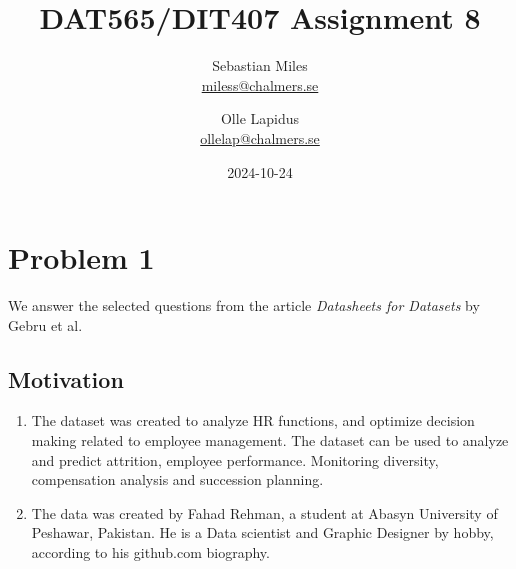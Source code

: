 \documentclass[a4paper]{article}
\newcommand{\enum}[1]{\begin{enumerate}[labelsep=0.3cm,labelwidth=\widthof{\ref{last-item}}, itemindent=0em,leftmargin=!, label=\arabic*).]#1 \end{enumerate}}
\begin{document}
\author{
  Sebastian Miles \\
  \href{mailto:miless@chalmers.se}{miless@chalmers.se}
  \and
  Olle Lapidus \\
  \href{mailto:ollelap@chalmers.se}{ollelap@chalmers.se}
}
\title{DAT565/DIT407 Assignment 8}
\date{2024-10-24}

\maketitle
\section*{Problem 1}
We answer the selected questions from the article \textit{Datasheets for Datasets} by Gebru et al. \cite{Gebru:2021}
\subsection*{Motivation}
\enum{
\item The dataset was created to analyze HR functions, and optimize decision making related to employee management. The dataset can be used to analyze and predict attrition, employee performance. Monitoring diversity, compensation analysis and succession planning.
\item The data was created by Fahad Rehman, a student at Abasyn University of Peshawar, Pakistan. He is a Data scientist and Graphic Designer by hobby, according to his github.com biography. 
}
\end{document}
